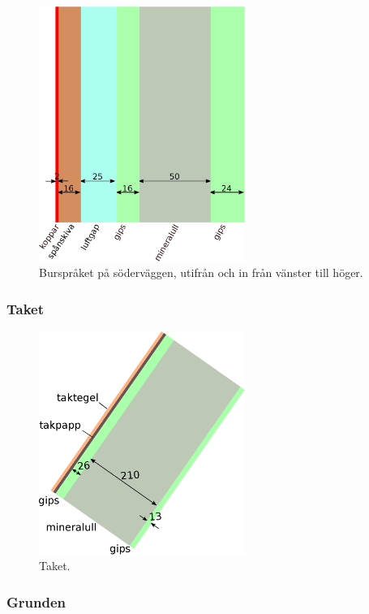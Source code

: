 \begin{figure}[hpbt]
\centering
\includegraphics[width=0.6\textwidth]{../images/bursprak.eps}
\caption{\label{fig:sodervagg}{Burspråket på söderväggen, utifrån och in från vänster till höger.}}
\end{figure}

\subsubsection{Taket}

\begin{figure}[hpbt]
\centering
\includegraphics[width=0.6\textwidth]{../images/taket.eps}
\caption{\label{fig:sodervagg}{Taket.}}
\end{figure}

\subsubsection{Grunden}

